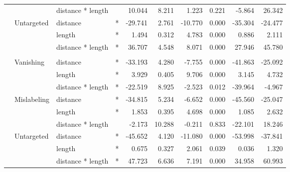 \begin{longtable}[t]{llllrrrrrr}
\cmidrule{3-10}\nopagebreak
\hspace{1em} &  & distance * length &  & 10.044 & 8.211 & 1.223 & 0.221 & -5.864 & 26.342\\
\cmidrule{2-10}\nopagebreak
\hspace{1em} & Untargeted & distance & * & -29.741 & 2.761 & -10.770 & 0.000 & -35.304 & -24.477\\
\cmidrule{3-10}\nopagebreak
\hspace{1em} &  & length & * & 1.494 & 0.312 & 4.783 & 0.000 & 0.886 & 2.111\\
\cmidrule{3-10}\nopagebreak
\hspace{1em} &  & distance * length & * & 36.707 & 4.548 & 8.071 & 0.000 & 27.946 & 45.780\\
\cmidrule{1-10}\pagebreak[0]
\addlinespace[0.3em]
\multicolumn{10}{l}{\textbf{Cascade R-CNN}}\\
\hspace{1em} & Vanishing & distance & * & -33.193 & 4.280 & -7.755 & 0.000 & -41.863 & -25.092\\
\cmidrule{3-10}\nopagebreak
\hspace{1em} &  & length & * & 3.929 & 0.405 & 9.706 & 0.000 & 3.145 & 4.732\\
\cmidrule{3-10}\nopagebreak
\hspace{1em} &  & distance * length & * & -22.519 & 8.925 & -2.523 & 0.012 & -39.964 & -4.967\\
\cmidrule{2-10}\nopagebreak
\hspace{1em} & Mislabeling & distance & * & -34.815 & 5.234 & -6.652 & 0.000 & -45.560 & -25.047\\
\cmidrule{3-10}\nopagebreak
\hspace{1em} &  & length & * & 1.853 & 0.395 & 4.698 & 0.000 & 1.085 & 2.632\\
\cmidrule{3-10}\nopagebreak
\hspace{1em} &  & distance * length &  & -2.173 & 10.288 & -0.211 & 0.833 & -22.101 & 18.246\\
\cmidrule{2-10}\nopagebreak
\hspace{1em} & Untargeted & distance & * & -45.652 & 4.120 & -11.080 & 0.000 & -53.998 & -37.841\\
\cmidrule{3-10}\nopagebreak
\hspace{1em} &  & length & * & 0.675 & 0.327 & 2.061 & 0.039 & 0.036 & 1.320\\
\cmidrule{3-10}\nopagebreak
\hspace{1em} &  & distance * length & * & 47.723 & 6.636 & 7.191 & 0.000 & 34.958 & 60.993\\
\bottomrule
\end{longtable}
\endgroup{}


